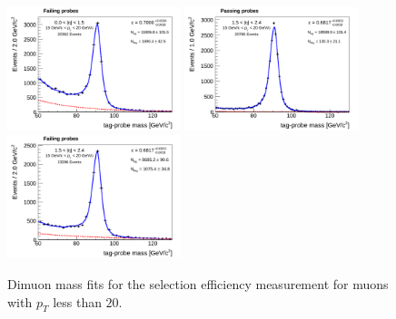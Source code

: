 \begin{figure}[!htbp]
\begin{center}
\includegraphics[width=0.45\textwidth]{figures/MuonSelectionEffMassFitFail_EtaPtBin2.pdf}
\includegraphics[width=0.45\textwidth]{figures/MuonSelectionEffMassFitPass_EtaPtBin3.pdf}
\includegraphics[width=0.45\textwidth]{figures/MuonSelectionEffMassFitFail_EtaPtBin3.pdf}
\caption{Dimuon mass fits for the selection efficiency measurement for muons with
$p_{T}$ less than $20$\GeV.}
\label{fig:mu_selectionEfficiency_massfits_lowPt}
\end{center}
\end{figure}

